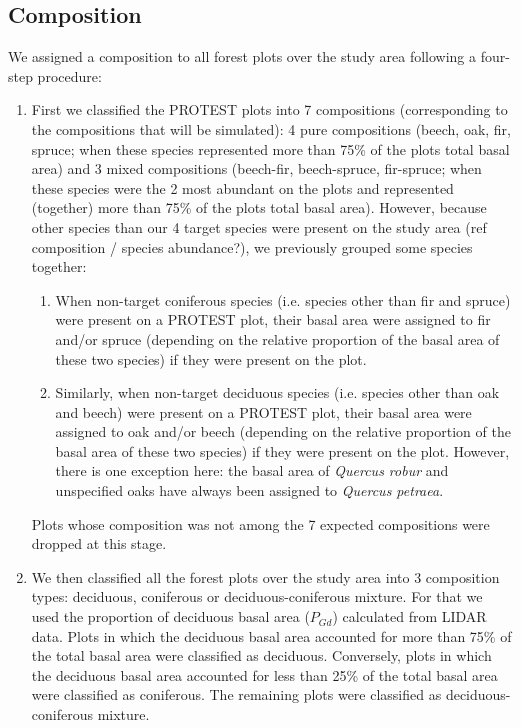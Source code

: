 \documentclass[a4paper]{article}
\begin{document}

\subsection*{Composition}

We assigned a composition to all forest plots over the study area following a four-step procedure:

\begin{enumerate}

    \item First we classified the PROTEST plots into 7 compositions (corresponding to the compositions that will be simulated): 4 pure compositions (beech, oak, fir, spruce; when these species represented more than 75\% of the plots total basal area) and 3 mixed compositions (beech-fir, beech-spruce, fir-spruce; when these species were the 2 most abundant on the plots and represented (together) more than 75\% of the plots total basal area). However, because other species than our 4 target species were present on the study area (ref composition / species abundance?), we previously grouped some species together:

    \begin{enumerate}

        \item When non-target coniferous species (i.e. species other than fir and spruce) were present on a PROTEST plot, their basal area were assigned to fir and/or spruce (depending on the relative proportion of the basal area of these two species) if they were present on the plot.

        \item Similarly, when non-target deciduous species (i.e. species other than oak and beech) were present on a PROTEST plot, their basal area were assigned to oak and/or beech (depending on the relative proportion of the basal area of these two species) if they were present on the plot. However, there is one exception here: the basal area of \textit{Quercus robur} and unspecified oaks have always been assigned to \textit{Quercus petraea}.

    \end{enumerate}

    Plots whose composition was not among the 7 expected compositions were dropped at this stage.

    \item We then classified all the forest plots over the study area into 3 composition types: deciduous, coniferous or deciduous-coniferous mixture. For that we used the proportion of deciduous basal area ($P_{Gd}$) calculated from LIDAR data. Plots in which the deciduous basal area accounted for more than 75\% of the total basal area were classified as deciduous. Conversely, plots in which the deciduous basal area accounted for less than 25\% of the total basal area were classified as coniferous. The remaining plots were classified as deciduous-coniferous mixture.


\end{enumerate}
\end{document}
